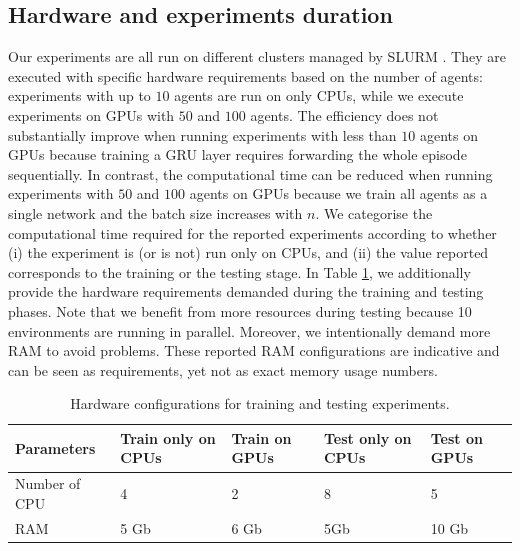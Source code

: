 \subsection{Hardware and experiments duration}
\label{app:duration}

Our experiments are all run on different clusters managed by SLURM \citep{yoo2003slurm}.
They are executed with specific hardware requirements based on the number of agents: experiments with up to $10$ agents are run on only CPUs, while we execute experiments on GPUs with $50$ and $100$ agents.
The efficiency does not substantially improve when running experiments with less than $10$ agents on GPUs because training a GRU layer requires forwarding the whole episode sequentially.
In contrast, the computational time can be reduced when running experiments with $50$ and $100$ agents on GPUs because we train all agents as a single network and the batch size increases with $n$. 
We categorise the computational time required for the reported experiments according to whether (i) the experiment is (or is not) run only on CPUs, and (ii) the value reported corresponds to the training or the testing stage.
In Table \ref{tab:slurmdetails}, we additionally provide the hardware requirements demanded during the training and testing phases.
Note that we benefit from more resources during testing because 10 environments are running in parallel.
Moreover, we intentionally demand more RAM to avoid problems.
These reported RAM configurations are indicative and can be seen as requirements, yet not as exact memory usage numbers.

\begin{table}
  \caption{Hardware configurations for training and testing experiments.}
  \label{tab:slurmdetails}
  \centering
  \begin{tabular}{lllll}
    \toprule
    Parameters & Train only on CPUs & Train on GPUs & Test only on CPUs & Test on GPUs \\ 
    \midrule
    Number of CPU & 4  & 2 & 8 & 5 \\ 
    RAM           & 5 Gb & 6 Gb & 5Gb & 10 Gb \\ 
    \bottomrule
  \end{tabular}
\end{table}

